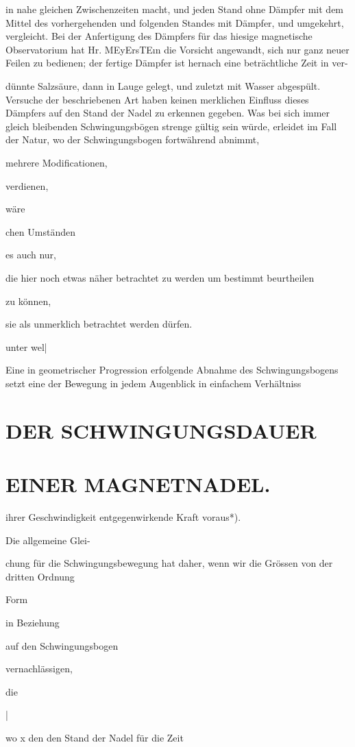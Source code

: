 \documentclass[12pt,a4paper]{article}
\begin{document}
in nahe gleichen Zwischenzeiten macht, und jeden Stand ohne Dämpfer mit dem Mittel des vorhergehenden und folgenden Standes mit Dämpfer, und umgekehrt, vergleicht. Bei der Anfertigung des Dämpfers für das hiesige magnetische Observatorium hat Hr. MEyErsTEın die Vorsicht angewandt, sich nur ganz neuer Feilen zu bedienen; der fertige Dämpfer ist hernach eine beträchtliche Zeit in ver-

dünnte Salzsäure, dann in Lauge gelegt, und zuletzt mit Wasser abgespült. Versuche der beschriebenen Art haben keinen merklichen Einfluss dieses Dämpfers auf den Stand der Nadel zu erkennen gegeben. Was bei sich immer gleich bleibenden Schwingungsbögen strenge gültig sein würde, erleidet im Fall der Natur, wo der Schwingungsbogen fortwährend abnimmt,

mehrere Modificationen,

verdienen,

wäre

chen Umständen

es auch nur,

die hier noch etwas näher betrachtet zu werden um bestimmt beurtheilen

zu können,

sie als unmerklich betrachtet werden dürfen.

unter wel|

Eine in geometrischer Progression erfolgende Abnahme des Schwingungsbogens setzt eine der Bewegung in jedem Augenblick in einfachem Verhältniss

\section*{DER SCHWINGUNGSDAUER}
\section*{EINER MAGNETNADEL.}
ihrer Geschwindigkeit entgegenwirkende Kraft voraus*).

Die allgemeine Glei-

chung für die Schwingungsbewegung hat daher, wenn wir die Grössen von der dritten Ordnung

Form

in Beziehung

auf den Schwingungsbogen

vernachlässigen,

die

|

wo x den den Stand der Nadel für die Zeit
\end{document}
